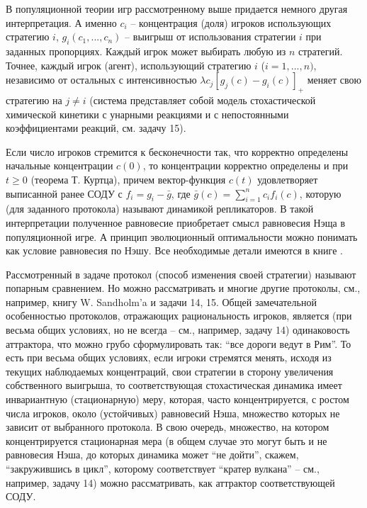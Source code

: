 \begin{remark}
В популяционной теории игр рассмотренному выше придается немного другая 
интерпретация. А именно $c_i $ -- концентрация (доля) игроков использующих 
стратегию $i$, $g_i \left( {c_1 ,...,c_n } \right)$ -- выигрыш от 
использования стратегии $i$ при заданных пропорциях. Каждый игрок может 
выбирать любую из $n$ стратегий. Точнее, каждый игрок (агент), использующий 
стратегию $i$ ($i=1,...,n)$, независимо от остальных с 
интенсивностью $\lambda c_j \left[ {g_j \left( c \right)-g_i \left( 
c \right)} \right]_+ $ меняет свою стратегию на $j\ne i$ (система 
представляет собой модель стохастической химической кинетики с унарными 
реакциями и с непостоянными коэффициентами реакций, см. задачу 15). 


Если число игроков стремится к бесконечности так, что корректно определены 
начальные концентрации $c\left( 0 \right)$, то концентрации корректно 
определены и при $t\ge 0$ (теорема Т. Куртца), причем вектор-функция 
$c\left( t \right)$ удовлетворяет выписанной ранее СОДУ с $f_i =g_i -\bar 
{g}$, где $\bar {g}\left( c \right)=\sum\limits_{i=1}^n {c_i f_i \left( c 
\right)} $, которую (для заданного протокола) называют динамикой 
репликаторов. В такой интерпретации полученное равновесие приобретает смысл 
равновесия Нэща в популяционной игре. А принцип эволюционный оптимальности 
можно понимать как условие равновесия по Нэшу. Все необходимые детали 
имеются в книге \cite{222}. 

Рассмотренный в задаче протокол (способ изменения своей стратегии) 
называют попарным сравнением. Но можно рассматривать и многие другие 
протоколы, см., например, книгу W. Sandholm'a \cite{222} и задачи 14, 15. Общей 
замечательной особенностью протоколов, отражающих рациональность игроков, 
является (при весьма общих условиях, но не всегда -- см., например, задачу 
14) одинаковость аттрактора, что можно грубо сформулировать так: ``все 
дороги ведут в Рим''. То есть при весьма общих условиях, если игроки 
стремятся менять, исходя из текущих наблюдаемых концентраций, свои стратегии 
в сторону увеличения собственного выигрыша, то соответствующая 
стохастическая динамика имеет инвариантную (стационарную) меру, которая, 
часто концентрируется, с ростом числа игроков, около (устойчивых) равновесий 
Нэша, множество которых не зависит от выбранного протокола. В свою очередь, 
множество, на котором концентрируется стационарная мера (в общем случае это 
могут быть и не равновесия Нэша, до которых динамика может ``не дойти'', 
скажем, ``закружившись в цикл'', которому соответствует ``кратер вулкана'' 
-- см., например, задачу 14) можно рассматривать, как аттрактор 
соответствующей СОДУ.


\end{remark}
